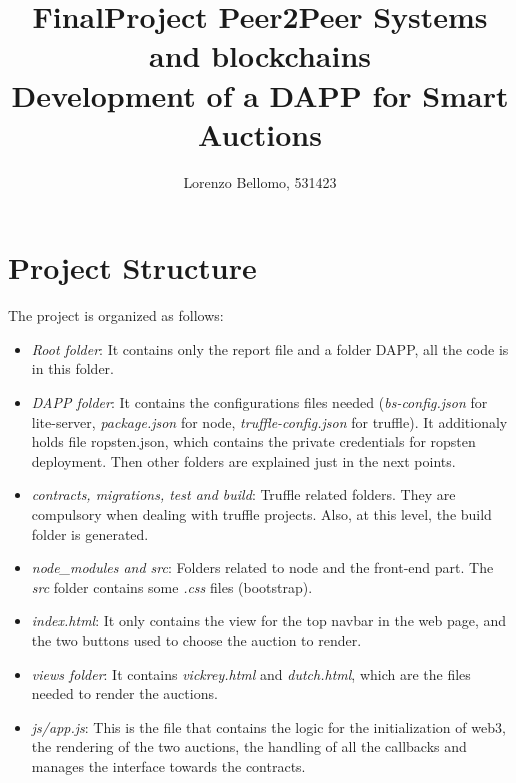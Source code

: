 \documentclass[11pt, a4paper]{report}
\title{
	FinalProject Peer2Peer Systems and blockchains \\
	\large Development of a DAPP for Smart Auctions}
\author{Lorenzo Bellomo, 531423}
\date{}
\begin{document}
	\maketitle
	
\section*{Project Structure}
The project is organized as follows:
\begin{itemize}
	\item \emph{Root folder}: It contains only the report file and a folder DAPP, all the code is in this folder.
	\item \emph{DAPP folder}: It contains the configurations files needed (\emph{bs-config.json} for lite-server, \emph{package.json} for node, \emph{truffle-config.json} for truffle). It additionaly holds file ropsten.json, which contains the private credentials for ropsten deployment. Then other folders are explained just in the next points.
	\item \emph{contracts, migrations, test and build}: Truffle related folders. They are compulsory when dealing with truffle projects. Also, at this level, the build folder is generated.
	\item \emph{node\_modules and src}: Folders related to node and the front-end part. The \emph{src} folder contains some \emph{.css} files (bootstrap).
	\item \emph{index.html}: It only contains the view for the top navbar in the web page, and the two buttons used to choose the auction to render.
	\item \emph{views folder}: It contains \emph{vickrey.html} and \emph{dutch.html}, which are the files needed to render the auctions.
	\item \emph{js/app.js}: This is the file that contains the logic for the initialization of web3, the rendering of the two auctions, the handling of all the callbacks and manages the interface towards the contracts.
\end{itemize}
\end{document}
